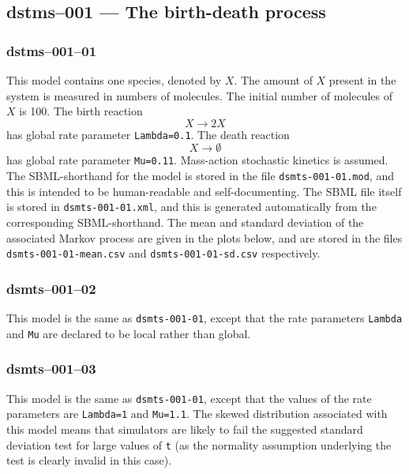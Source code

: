 
\subsection{dstms--001 --- The birth-death process}

\subsubsection{dstms--001--01}

This model contains one species, denoted by $X$. The amount of $X$ present
in the system is measured in numbers of molecules. The initial number
of molecules of $X$ is 100. The birth reaction 
\[
X \longrightarrow 2X
\] has global rate
parameter \verb$Lambda=0.1$. The death reaction 
\[
X \longrightarrow \emptyset
\]
has global rate parameter \verb$Mu=0.11$. Mass-action stochastic
kinetics is assumed. The SBML-shorthand for the model is stored in the
file \verb$dsmts-001-01.mod$, and this is intended to be
human-readable and self-documenting. The SBML file itself is stored in
\verb$dsmts-001-01.xml$, and this is generated automatically from the
corresponding SBML-shorthand. The mean and standard deviation of the
associated Markov process are given in the plots below, and are stored
in the files \verb$dsmts-001-01-mean.csv$ and
\verb$dsmts-001-01-sd.csv$ respectively.


\subsubsection{dsmts--001--02}

This model is the same as \texttt{dsmts-001-01}, except that the rate
parameters \verb$Lambda$ and \verb$Mu$ are declared to be local rather
than global.


\subsubsection{dsmts--001--03}

This model is the same as \texttt{dsmts-001-01}, except
that the values of the rate parameters are \verb$Lambda=1$ and
\verb$Mu=1.1$. The skewed distribution associated with this model
means that simulators are likely to fail the suggested standard
deviation test for large values of \verb$t$ (as the normality
assumption underlying the test is clearly invalid in this case).

